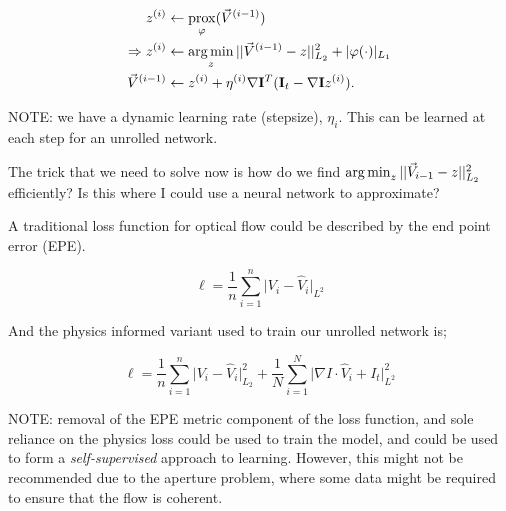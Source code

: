 \begin{align*}
    z^{(i)} &\leftarrow \operatorname*{\mathrm{prox}}_\varphi (\vec{V}^{(i-1)}) \\
    \Rightarrow z^{(i)} &\leftarrow \operatorname*{arg\,min}_{z} ||\vec{V}^{(i-1)} - z||^{2}_{L_2} + |\varphi(\cdot)|_{L_1}\\
    \vec{V}^{(i-1)} &\leftarrow z^{(i)} + \eta^{(i)} \nabla \mathbf{I}^{T} (\mathbf{I}_t - \nabla \mathbf{I} z^{(i)}).
\end{align*}

\color{red} NOTE: we have a dynamic learning rate (stepsize), $\eta_i$. This can be learned at each step for an unrolled network. \color{gray}

The trick that we need to solve now is how do we find $\operatorname*{arg\,min}_{z} ||\vec{V}_{i-1} - z||^{2}_{L_2}$ efficiently? Is this where I could use a neural network to approximate?

A traditional loss function for optical flow could be described by the end point error (EPE).

\begin{equation*}
\ell = \frac{1}{n} \sum_{i=1}^{n} \big|V_{i} - \hat{V}_{i} \big|_{L^2}
\end{equation*}

And the physics informed variant used to train our unrolled network is;

\begin{equation*}
\ell = \frac{1}{n} \sum_{i=1}^{n} \big|V_{i} - \hat{V}_{i} \big|^2_{L_2} + \frac{1}{N} \sum_{i=1}^{N} \big|\nabla I \cdot \hat{V}_{i} + I_t \big|^2_{L^2}
\end{equation*}

\color{red}
NOTE: removal of the EPE metric component of the loss function, and sole reliance on the physics loss could be used to train the model, and could be used to form a \textit{self-supervised} approach to learning. However, this might not be recommended due to the aperture problem, where some data might be required to ensure that the flow is coherent.
\color{gray}

\color{black}